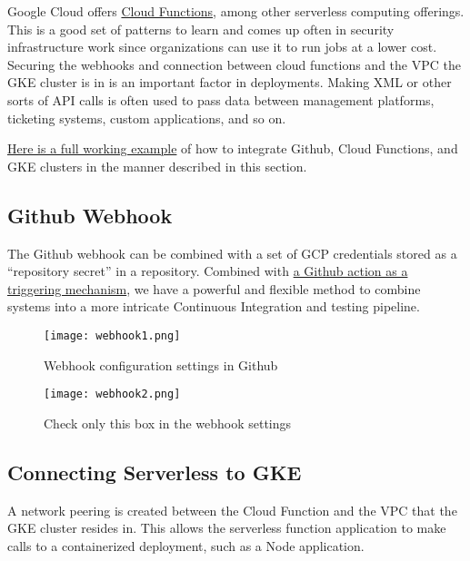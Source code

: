 \justifying
Google Cloud offers \href{https://cloud.google.com/functions/docs/concepts/overview}{Cloud Functions}, among other serverless computing offerings. This is a good set of patterns to learn and comes up often
in security infrastructure work since organizations can use it to run jobs at a lower cost. Securing the
webhooks and connection between cloud functions and the VPC the GKE cluster is in is an important
factor in deployments. Making XML or other sorts of API calls is often used to pass data between management platforms, ticketing systems, custom applications, and so on.
\vspace{2mm}

\justifying
\href{https://github.com/devsecfranklin/workshop-codemash-2023}{Here is a full working example} of how to integrate Github, Cloud Functions, and GKE clusters in the manner described in this section.

\subsection{Github Webhook}
\vspace{2mm}

\justifying
The Github webhook can be combined with a set of GCP credentials stored as a ``repository secret'' in
a repository. Combined with \href{https://github.com/devsecfranklin/workshop-codemash-2023/blob/main/.github/workflows/cloudbot-call.yml}{a Github action as a triggering mechanism}, we have a powerful and flexible
method to combine systems into a more intricate Continuous Integration and testing pipeline.

\begin{figure}[H]
	\texttt{[image: webhook1.png]}
	\caption{Webhook configuration settings in Github}
	\label{pr}
\end{figure}

\begin{figure}[H]
	\texttt{[image: webhook2.png]}
	\caption{Check only this box in the webhook settings}
	\label{pr}
\end{figure}


\subsection{Connecting Serverless to GKE}
\vspace{2mm}

\justifying
A network peering is created between the Cloud Function and the VPC that the GKE cluster resides in.
This allows the serverless function application to make calls to a containerized deployment, such as
a Node application.
\vspace{2mm}

